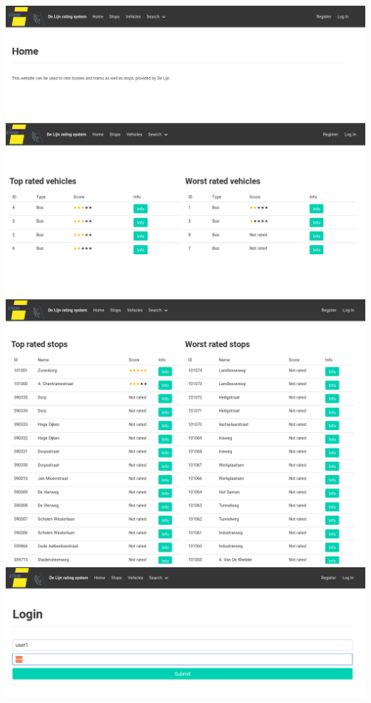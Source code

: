 \documentclass[12pt,a4paper]{article}
\begin{document}
\includegraphics[scale=0.3]{home}\\
\includegraphics[scale=0.3]{vehicles}\\
\includegraphics[scale=0.3]{stops}\\
\includegraphics[scale=0.3]{login}\\
\end{document}
